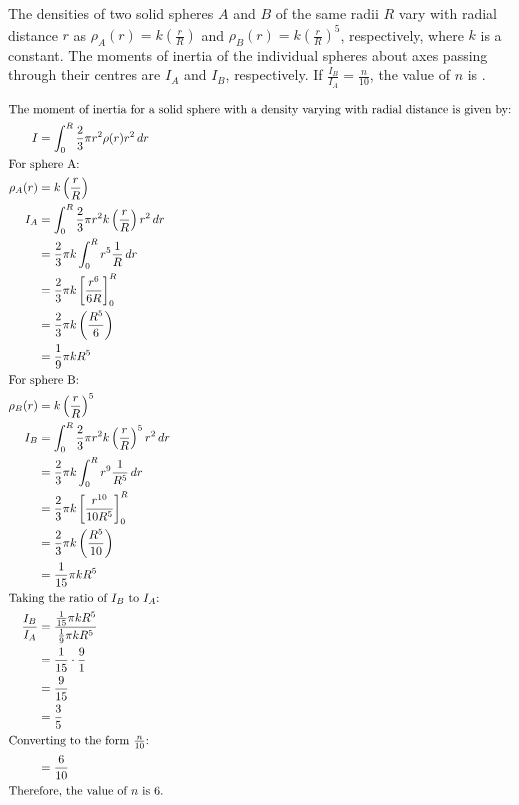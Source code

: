 
\item The densities of two solid spheres \( A \) and \( B \) of the same radii \( R \) vary with radial distance \( r \) as \( \rho_A(r) = k \left( \frac{r}{R} \right) \) and \( \rho_B(r) = k \left( \frac{r}{R} \right)^5 \), respectively, where \( k \) is a constant. The moments of inertia of the individual spheres about axes passing through their centres are \( I_A \) and \( I_B \), respectively. If \( \frac{I_B}{I_A} = \frac{n}{10} \), the value of \( n \) is \underline{\hspace{2.5 cm}}.

    \begin{solution}
        \begin{align*}
            \intertext{The moment of inertia for a solid sphere with a density varying with radial distance is given by:}
            I &= \int_{0}^{R} \frac{2}{3} \pi r^2 \rho(r) r^2 \, dr\\
            \intertext{For sphere A:}
            \rho_A(r) &= k \left( \frac{r}{R} \right)\\
            I_A &= \int_{0}^{R} \frac{2}{3} \pi r^2 k \left( \frac{r}{R} \right) r^2 \, dr\\
            &= \frac{2}{3} \pi k \int_{0}^{R} r^5 \frac{1}{R} \, dr\\
            &= \frac{2}{3} \pi k \left[ \frac{r^6}{6R} \right]_{0}^{R}\\
            &= \frac{2}{3} \pi k \left( \frac{R^5}{6} \right)\\
            &= \frac{1}{9} \pi k R^5\\
            \intertext{For sphere B:}
            \rho_B(r) &= k \left( \frac{r}{R} \right)^5\\
            I_B &= \int_{0}^{R} \frac{2}{3} \pi r^2 k \left( \frac{r}{R} \right)^5 r^2 \, dr\\
            &= \frac{2}{3} \pi k \int_{0}^{R} r^9 \frac{1}{R^5} \, dr\\
            &= \frac{2}{3} \pi k \left[ \frac{r^{10}}{10R^5} \right]_{0}^{R}\\
            &= \frac{2}{3} \pi k \left( \frac{R^5}{10} \right)\\
            &= \frac{1}{15} \pi k R^5\\
            \intertext{Taking the ratio of \( I_B \) to \( I_A \):}
            \frac{I_B}{I_A} &= \frac{\frac{1}{15} \pi k R^5}{\frac{1}{9} \pi k R^5}\\
            &= \frac{1}{15} \cdot \frac{9}{1}\\
            &= \frac{9}{15}\\
            &= \frac{3}{5}\\
            \intertext{Converting to the form \( \frac{n}{10} \):}
            &= \frac{6}{10}\\
            \intertext{Therefore, the value of \( n \) is \( 6 \).}
        \end{align*}
    \end{solution}
